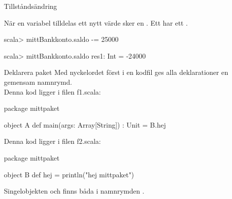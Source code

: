 \begin{Slide}{Tillståndsändring}

När en variabel tilldelas ett nytt värde sker en . Ett   har ett  .

\begin{REPLnonum}
scala> mittBankkonto.saldo -= 25000

scala> mittBankkonto.saldo
res1: Int = -24000
\end{REPLnonum}
\end{Slide}



\begin{Slide}{Deklarera paket}
Med nyckelordet  först i en kodfil ges alla deklarationer en gemensam namnrymd.\\
\vspace{1em}
Denna kod ligger i filen f1.scala:
\begin{Code}
package mittpaket

object A {
  def main(args: Array[String]) : Unit = B.hej
}
\end{Code}

Denna kod ligger i filen f2.scala:
\begin{Code}
package mittpaket

object B {
  def hej = println("hej mittpaket")
}
\end{Code}
Singelobjekten  och  finns båda i namnrymden .
\end{Slide}

